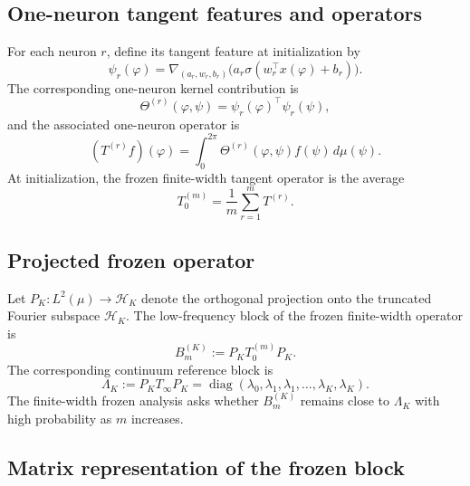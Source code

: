 \subsection{One-neuron tangent features and operators}

For each neuron \(r\), define its tangent feature at initialization by
\begin{equation}
	\psi_r(\varphi)
	=
	\nabla_{(a_r,w_r,b_r)}
	\bigl(a_r\sigma(w_r^\top x(\varphi)+b_r)\bigr).
	\label{eq:method-one-neuron-tangent-feature}
\end{equation}
The corresponding one-neuron kernel contribution is
\begin{equation}
	\Theta^{(r)}(\varphi,\psi)
	=
	\psi_r(\varphi)^\top \psi_r(\psi),
	\label{eq:method-one-neuron-kernel}
\end{equation}
and the associated one-neuron operator is
\begin{equation}
	(T^{(r)}f)(\varphi)
	=
	\int_0^{2\pi}\Theta^{(r)}(\varphi,\psi)f(\psi)\,d\mu(\psi).
	\label{eq:method-one-neuron-operator}
\end{equation}
At initialization, the frozen finite-width tangent operator is the average
\begin{equation}
	T_0^{(m)}=\frac1m\sum_{r=1}^m T^{(r)}.
	\label{eq:method-finite-width-frozen-average}
\end{equation}

\subsection{Projected frozen operator}

Let \( P_K:L^2(\mu)\to \mathcal H_K \)
denote the orthogonal projection onto the truncated Fourier subspace
\(\mathcal H_K\). The low-frequency block of the frozen finite-width operator is
\begin{equation}
	B_m^{(K)}:=P_KT_0^{(m)}P_K.
	\label{eq:method-finite-width-block}
\end{equation}
The corresponding continuum reference block is
\begin{equation}
	\Lambda_K:=P_KT_\infty P_K
	=
	\operatorname{diag}(\lambda_0,\lambda_1,\lambda_1,\dots,\lambda_K,\lambda_K).
	\label{eq:method-continuum-fourier-block}
\end{equation}
The finite-width frozen analysis asks whether \(B_m^{(K)}\) remains close to \(\Lambda_K\)
with high probability as \(m\) increases.

\subsection{Matrix representation of the frozen block}

